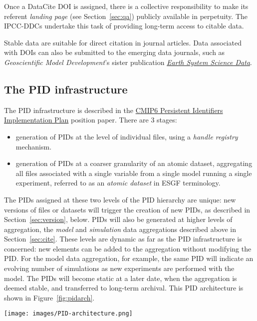 \documentclass[gmd,manuscript]{copernicus}
\newcommand{\figref}[1] {\mbox{Figure   \ref{fig:#1}}}
\newcommand{\secref}[1] {\mbox{Section  \ref{sec:#1}}}
\begin{document}
\begin{itemize}
  Once a DataCite DOI is assigned, there is a collective
  responsibility to make its referent \emph{landing page} (see
  \secref{qa}) publicly available in perpetuity. The IPCC-DDCs
  undertake this task of providing long-term access to citable data.

  Stable data are suitable for direct citation in journal articles.
  Data associated with DOIs can also be submitted to the emerging data
  journals, such as \emph{Geoscientific Model Development}'s sister
  publication
  \href{https://www.earth-system-science-data.net/}{\emph{Earth System
      Science Data}}.
\end{itemize}

\subsection{The PID infrastructure}
\label{sec:pid}

The PID infrastructure is described in the
\href{https://goo.gl/dQAEDy}{CMIP6 Persistent Identifiers
  Implementation Plan} position paper. There are 3 stages:

\begin{itemize}
\item generation of PIDs at the level of individual files, using a
  \emph{handle registry} mechanism.
\item generation of PIDs at a coarser granularity of an atomic
  dataset, aggregating all files associated with a single variable
  from a single model running a single experiment, referred to as an
  \emph{atomic dataset} in ESGF terminology.
\end{itemize}

The PIDs assigned at these two levels of the PID hierarchy are unique:
new versions of files or datasets will trigger the creation of new
PIDs, as described in \secref{version}, below. PIDs will also be
generated at higher levels of aggregation, the \emph{model} and
\emph{simulation} data aggregations described above in \secref{cite}.
These levels are dynamic as far as the PID infrastructure is
concerned: new elements can be added to
the aggregation without modifying the PID. For the model data aggregation, 
for example, the same PID will indicate an evolving number of simulations as new
experiments are performed with the model.  The PIDs will become static at
a later date, when the aggregation is deemed stable, and transferred
to long-term archival. This PID architecture is shown in
\figref{pidarch}.


\begin{figure*}
  \begin{center}
    \texttt{[image: images/PID-architecture.png]}
  \end{center}
  \caption{PID architecture, showing layers in the PID hierarchy. In
    the lower layers of the hierarchy, PIDs are static once generated,
    and new datasets generate new versions with new PIDs. Figure
    courtesy Tobias Weigel.}
  \label{fig:pidarch}
\end{figure*}
\end{document}
